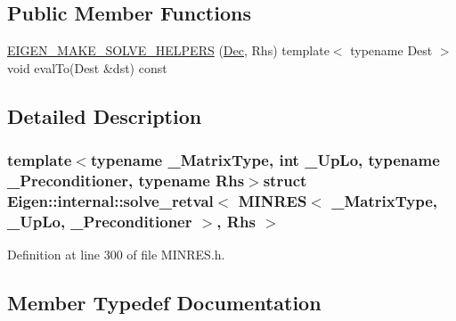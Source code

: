 \subsection*{Public Member Functions}
\begin{DoxyCompactItemize}
\item 
\hyperlink{struct_eigen_1_1internal_1_1solve__retval_3_01_m_i_n_r_e_s_3_01___matrix_type_00_01___up_lo_00_033d2aeef68dae51d28c316c0d126c387_afeed011c42a6500a19fdd146cd997528}{E\+I\+G\+E\+N\+\_\+\+M\+A\+K\+E\+\_\+\+S\+O\+L\+V\+E\+\_\+\+H\+E\+L\+P\+E\+R\+S} (\hyperlink{struct_eigen_1_1internal_1_1solve__retval_3_01_m_i_n_r_e_s_3_01___matrix_type_00_01___up_lo_00_033d2aeef68dae51d28c316c0d126c387_a3eec3b64852430c6fa2417ee707726f2}{Dec}, Rhs) template$<$ typename Dest $>$ void eval\+To(Dest \&dst) const 
\end{DoxyCompactItemize}


\subsection{Detailed Description}
\subsubsection*{template$<$typename \+\_\+\+Matrix\+Type, int \+\_\+\+Up\+Lo, typename \+\_\+\+Preconditioner, typename Rhs$>$struct Eigen\+::internal\+::solve\+\_\+retval$<$ M\+I\+N\+R\+E\+S$<$ \+\_\+\+Matrix\+Type, \+\_\+\+Up\+Lo, \+\_\+\+Preconditioner $>$, Rhs $>$}



Definition at line 300 of file M\+I\+N\+R\+E\+S.\+h.



\subsection{Member Typedef Documentation}
\hypertarget{struct_eigen_1_1internal_1_1solve__retval_3_01_m_i_n_r_e_s_3_01___matrix_type_00_01___up_lo_00_033d2aeef68dae51d28c316c0d126c387_a3eec3b64852430c6fa2417ee707726f2}{}
